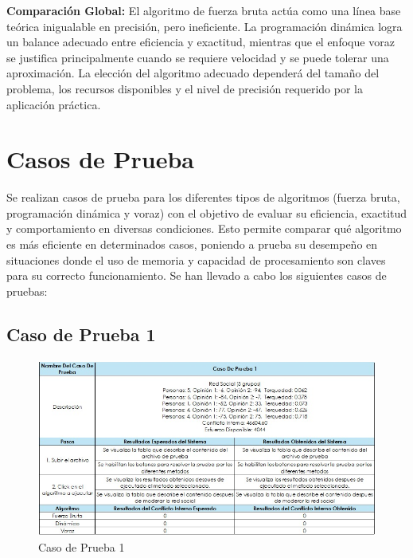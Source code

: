 \documentclass[11pt,letter]{article}
\begin{document}
    \textbf{Comparación Global:} El algoritmo de fuerza bruta actúa como una línea base teórica inigualable en precisión, pero ineficiente. La programación dinámica logra un balance adecuado entre eficiencia y exactitud, mientras que el enfoque voraz se justifica principalmente cuando se requiere velocidad y se puede tolerar una aproximación. La elección del algoritmo adecuado dependerá del tamaño del problema, los recursos disponibles y el nivel de precisión requerido por la aplicación práctica.


    \newpage



    \section{Casos de Prueba}

    Se realizan casos de prueba para los diferentes tipos de algoritmos (fuerza bruta, programación dinámica y voraz) con el objetivo de evaluar su eficiencia, exactitud y comportamiento en diversas condiciones. Esto permite comparar qué algoritmo es más eficiente en determinados casos, poniendo a prueba su desempeño en situaciones donde el uso de memoria y capacidad de procesamiento son claves para su correcto funcionamiento. Se han llevado a cabo los siguientes casos de pruebas:

\subsection{Caso de Prueba 1}
\begin{figure}[H]
    \centering
    \includegraphics[width=\linewidth]{resources/cp1.jpeg}
    \caption{Caso de Prueba 1}
    \label{fig:cp1}
\end{figure}
\end{document}
